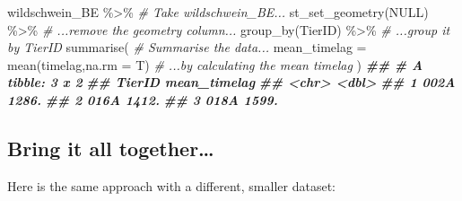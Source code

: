\documentclass[
]{book}
\newenvironment{Shaded}{\begin{snugshade}}{\end{snugshade}}
\newcommand{\AttributeTok}[1]{\textcolor[rgb]{0.77,0.63,0.00}{#1}}
\newcommand{\CommentTok}[1]{\textcolor[rgb]{0.56,0.35,0.01}{\textit{#1}}}
\newcommand{\ConstantTok}[1]{\textcolor[rgb]{0.00,0.00,0.00}{#1}}
\newcommand{\DocumentationTok}[1]{\textcolor[rgb]{0.56,0.35,0.01}{\textbf{\textit{#1}}}}
\newcommand{\FunctionTok}[1]{\textcolor[rgb]{0.00,0.00,0.00}{#1}}
\newcommand{\NormalTok}[1]{#1}
\newcommand{\SpecialCharTok}[1]{\textcolor[rgb]{0.00,0.00,0.00}{#1}}
\begin{document}
\begin{Shaded}
\begin{Highlighting}[]

\NormalTok{wildschwein\_BE }\SpecialCharTok{\%\textgreater{}\%}                     \CommentTok{\# Take wildschwein\_BE...}
  \FunctionTok{st\_set\_geometry}\NormalTok{(}\ConstantTok{NULL}\NormalTok{) }\SpecialCharTok{\%\textgreater{}\%}            \CommentTok{\# ...remove the geometry column...}
  \FunctionTok{group\_by}\NormalTok{(TierID) }\SpecialCharTok{\%\textgreater{}\%}                 \CommentTok{\# ...group it by TierID}
  \FunctionTok{summarise}\NormalTok{(                           }\CommentTok{\# Summarise the data...}
    \AttributeTok{mean\_timelag =} \FunctionTok{mean}\NormalTok{(timelag,}\AttributeTok{na.rm =}\NormalTok{ T) }\CommentTok{\# ...by calculating the mean timelag}
\NormalTok{  )}
\DocumentationTok{\#\# \# A tibble: 3 x 2}
\DocumentationTok{\#\#   TierID mean\_timelag}
\DocumentationTok{\#\#   \textless{}chr\textgreater{}         \textless{}dbl\textgreater{}}
\DocumentationTok{\#\# 1 002A          1286.}
\DocumentationTok{\#\# 2 016A          1412.}
\DocumentationTok{\#\# 3 018A          1599.}
\end{Highlighting}
\end{Shaded}

\hypertarget{bring-it-all-together}{%
\subsection{Bring it all together\ldots{}}\label{bring-it-all-together}}

Here is the same approach with a different, smaller dataset:
\end{document}
